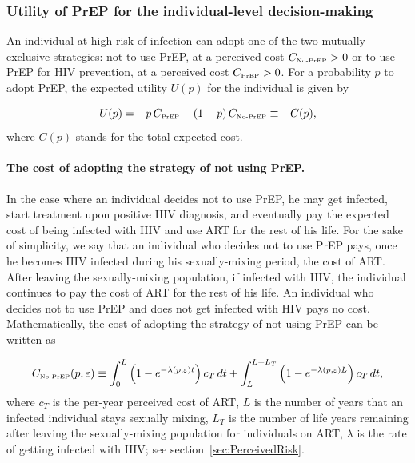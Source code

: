\documentclass[12pt]{article}
\begin{document}
\subsubsection{Utility of PrEP for the individual-level decision-making} \label{sec:Utility}

An individual at high risk of infection can adopt one of the two mutually exclusive strategies: not to use PrEP, at a perceived cost $C_{\text{\tiny No-PrEP}}>0$ or to use PrEP for HIV prevention, at a perceived cost $C_{\text{\tiny PrEP}}>0$. For a probability $p$ to adopt PrEP, the expected utility $U(p)$ for the individual is given by 

\begin{equation}
	U(p) = - p \, C_{\text{\tiny PrEP}} - (1- p) \, C_{\text{\tiny No-PrEP}}\equiv-C(p), 
\end{equation}
where $C(p)$ stands for the total expected cost.

\paragraph{The cost of adopting the strategy of not using PrEP.}

In the case where an individual decides not to use PrEP, he may get infected, start treatment upon positive HIV diagnosis, and eventually pay the {expected} cost of {being infected with HIV and use} ART for the rest of his life. {For the sake of simplicity, we say} that an individual who decides not to use PrEP pays, once he becomes HIV infected during his sexually-mixing period, the cost of ART. After leaving the sexually-mixing population, if infected with HIV, the individual continues to pay the cost of ART for the rest of his life. An individual who decides not to use PrEP and does not get infected with HIV pays no cost. Mathematically, the cost of adopting the strategy of not using PrEP can be written as

\begin{equation} \label{eq:C_NoPrEP}
	C_{\text{\tiny No-PrEP}}(p,\varepsilon) \equiv \int_ 0^{L} \left(1- e^{-\lambda(p,\varepsilon) t} \right) c_T \,dt + \int_L^{L+L_T} \left(1- e^{-\lambda(p,\varepsilon) L} \right) c_T \,dt,
\end{equation}
where $c_T$ is the per-year perceived cost of ART, $L$ is the number of years that an infected individual stays sexually mixing,  $L_T$ is the number of life years remaining after leaving the sexually-mixing population for individuals on ART, $\lambda$ is the rate of getting infected with HIV; see section~\ref{sec:PerceivedRisk}.
\end{document}
